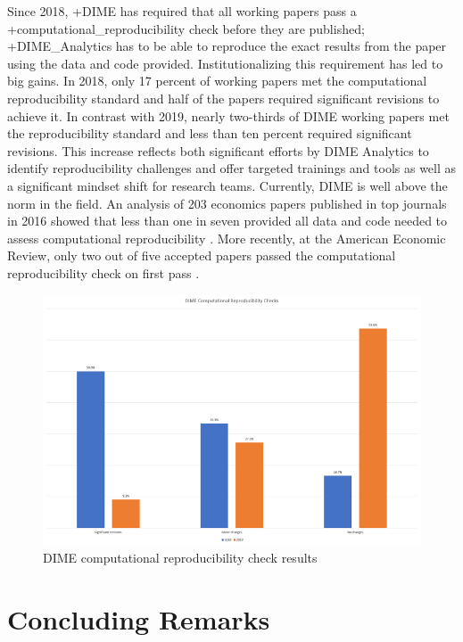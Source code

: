 \documentclass[
]{book}
\begin{document}
Since 2018, +DIME\textbar{} has required that all working papers pass a +computational\_reproducibility\textbar{} check before they are published; +DIME\_Analytics\textbar{} has to be able to reproduce the exact results from the paper using the data and code provided. Institutionalizing this requirement has led to big gains. In 2018, only 17 percent of working papers met the computational reproducibility standard and half of the papers required significant revisions to achieve it. In contrast with 2019, nearly two-thirds of DIME working papers met the reproducibility standard and less than ten percent required significant revisions. This increase reflects both significant efforts by DIME Analytics to identify reproducibility challenges and offer targeted trainings and tools as well as a significant mindset shift for research teams. Currently, DIME is well above the norm in the field. An analysis of 203 economics papers published in top journals in 2016 showed that less than one in seven provided all data and code needed to assess computational reproducibility \citep{galiani2017}. More recently, at the American Economic Review, only two out of five accepted papers passed the computational reproducibility check on first pass \citep{vilhuber2019}.

\begin{figure}
\includegraphics[width=1\linewidth]{./assets/dime/dimefigure6web} \caption{DIME computational reproducibility check results}\label{fig:dimefigure6}
\end{figure}

\hypertarget{concluding-remarks-3}{%
\section{Concluding Remarks}\label{concluding-remarks-3}}
\end{document}
